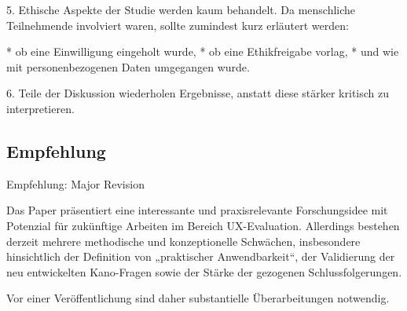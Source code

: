 \documentclass[12pt,DIV=14, version=first, BCOR=10mm,a4paper,twoside,parskip=half-,headsepline,headinclude]{scrartcl}
\begin{document}
5. Ethische Aspekte der Studie werden kaum behandelt. Da menschliche Teilnehmende involviert waren, sollte zumindest kurz erläutert werden:

* ob eine Einwilligung eingeholt wurde,
* ob eine Ethikfreigabe vorlag,
* und wie mit personenbezogenen Daten umgegangen wurde.

6. Teile der Diskussion wiederholen Ergebnisse, anstatt diese stärker kritisch zu interpretieren.

\subsection{Empfehlung}
Empfehlung: Major Revision

Das Paper präsentiert eine interessante und praxisrelevante Forschungsidee mit Potenzial für zukünftige Arbeiten im Bereich UX-Evaluation. Allerdings bestehen derzeit mehrere methodische und konzeptionelle Schwächen, insbesondere hinsichtlich der Definition von „praktischer Anwendbarkeit“, der Validierung der neu entwickelten Kano-Fragen sowie der Stärke der gezogenen Schlussfolgerungen.

Vor einer Veröffentlichung sind daher substantielle Überarbeitungen notwendig.
\end{document}
